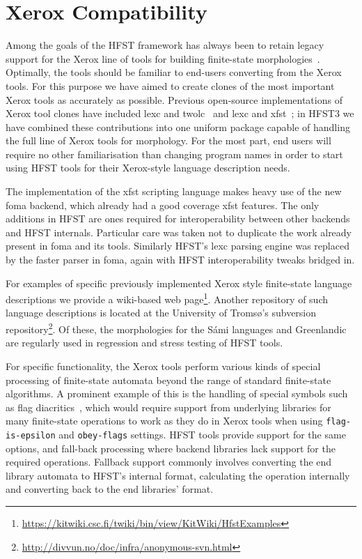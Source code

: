 \documentclass{llncs}
\begin{document}
\section{Xerox Compatibility}

Among the goals of the HFST framework has always been to retain legacy support
for the Xerox line of tools for building finite-state
morphologies~\cite{beesley/2003}. Optimally, the tools should be familiar
to end-users converting from the Xerox tools. For this purpose we have aimed to
create clones of the most important Xerox tools as accurately as possible.
Previous open-source implementations of Xerox tool clones have included
lexc and twolc~\cite{linden/2009/sfcm} and lexc and xfst~\cite{hulden/2009}; in
HFST3 we have combined these contributions into one uniform package capable of
handling the full line of Xerox tools for morphology. For the most part,
end users will require no other familiarisation than changing program names in
order to start using HFST tools for their Xerox-style language description
needs.

The implementation of the xfst scripting language makes heavy
use of the new foma backend, which already had a good coverage xfst
features. The only additions in HFST are ones required for
interoperability between other backends and HFST internals. Particular
care was taken not to duplicate the work already present in foma and its
tools. Similarly HFST's lexc parsing engine was
replaced by the faster parser in foma, again with HFST interoperability
tweaks bridged in.

For examples of specific previously implemented Xerox style finite-state
language descriptions we provide a wiki-based web page\footnote{\url{https://kitwiki.csc.fi/twiki/bin/view/KitWiki/HfstExamples}}. Another repository of
such language descriptions is located at the University of Tromsø's subversion
repository\footnote{\url{http://divvun.no/doc/infra/anonymous-svn.html}}.
Of these, the morphologies for the Sámi languages and Greenlandic are 
regularly used in regression and stress testing of HFST tools.

For specific functionality, the Xerox tools perform various kinds of special
processing of finite-state automata beyond the range of standard finite-state
algorithms. A prominent example of this is the handling of special symbols such
as flag diacritics~\cite{beesley/1998}, which would require support from
underlying libraries for many finite-state operations to work as they do in
Xerox tools when using \texttt{flag-is-epsilon} and \texttt{obey-flags}
settings. HFST tools provide support for the same options, and
fall-back processing where backend libraries lack support for the
required operations. Fallback support commonly involves converting the end
library automata to HFST's internal format, calculating the operation
internally and converting back to the end libraries' format. 
\end{document}
